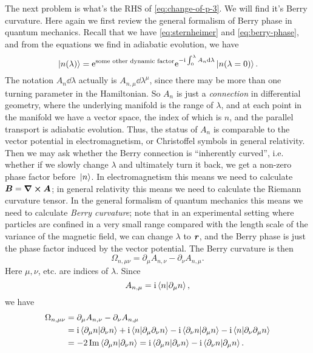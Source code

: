\documentclass[hyperref, a4paper]{article}
\newcommand*{\ii}{\mathrm{i}}
\newcommand*{\ee}{\mathrm{e}}
\begin{document}
The next problem is what's the RHS of \eqref{eq:change-of-p-3}.
We will find it's Berry curvature. 
Here again we first review the general formalism of Berry phase in quantum mechanics.
Recall that we have \eqref{eq:sternheimer} and \eqref{eq:berry-phase}, 
and from the equations we find in adiabatic evolution, 
we have 
\begin{equation}
    \ket*{n(\lambda)} = \ee^{\text{some other dynamic factor}} \ee^{- \ii \int_{0}^{\lambda} A_n \dd{\lambda} } \ket*{n(\lambda = 0)}.
\end{equation}
The notation $A_n \dd{\lambda}$ actually is 
$A_{n, \mu} \dd{\lambda^\mu}$, 
since there may be more than one turning parameter in the Hamiltonian.
So $A_n$ is just a \emph{connection} in differential geometry,
where the underlying manifold is the range of $\lambda$,
and at each point in the manifold we have a vector space,
the index of which is $n$,
and the parallel transport is adiabatic evolution.
Thus, the status of $A_n$ is comparable to 
the vector potential in electromagnetism,
or Christoffel symbols in general relativity.
Then we may ask whether the Berry connection is ``inherently curved'',
i.e. whether if we slowly change $\lambda$ 
and ultimately turn it back, 
we get a non-zero phase factor before $\ket*{n}$.
In electromagnetism this means we need to calculate $\vb*{B} = \curl{\vb*{A}}$;
in general relativity this means we need to calculate the Riemann curvature tensor. 
In the general formalism of quantum mechanics 
this means we need to calculate \emph{Berry curvature};
note that in an experimental setting 
where particles are confined in a very small range compared with 
the length scale of the variance of the magnetic field, 
we can change $\lambda$ to $\vb*{r}$,
and the Berry phase is just the phase factor induced by the vector potential.
The Berry curvature is then 
\begin{equation}
    \Omega_{n, \mu \nu} = \partial_{\mu} A_{n, \nu} - \partial_{\nu} A_{n, \mu}.
\end{equation}
Here $\mu, \nu$, etc. are indices of $\lambda$.
Since 
\begin{equation}
    A_{n, \mu} = \ii \braket{n}{\partial_\mu n}, 
\end{equation}
we have 
\begin{equation}
    \begin{aligned}
        \Omega_{n, \mu \nu} &= \partial_{\mu} A_{n, \nu} - \partial_{\nu} A_{n, \mu} \\
        &= \ii \braket{\partial_{\mu} n}{\partial_{\nu} n} 
        + \ii \braket*{n}{\partial_\mu \partial_\nu n}
        - \ii \braket{\partial_{\nu} n}{\partial_{\mu} n}
        - \ii \braket*{n}{\partial_\nu \partial_\mu n} \\
        &= - 2 \Im \braket{\partial_{\mu} n}{\partial_{\nu} n}
        = \ii \braket{\partial_{\mu} n}{\partial_{\nu} n} 
        - \ii \braket{\partial_{\nu} n}{\partial_{\mu} n}.
    \end{aligned}
\end{equation}
\end{document}
